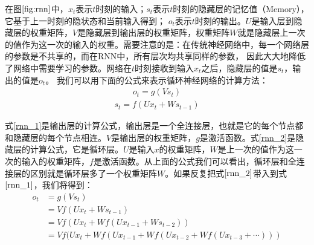 在图$\ref{fig:rnn}$中，$x_{t}$表示$t$时刻的输入；$s_{t}$表示$t$时刻的隐藏层的记忆值（Memory），它基于上一时刻的隐状态和当前输入得到；
$o_{t}$表示$t$时刻的输出。$U$是输入层到隐藏层的权重矩阵，$V$是隐藏层到输出层的权重矩阵，权重矩阵$W$就是隐藏层上一次的值作为这一次的输入的权重。需要注意的是：在传统神经网络中，每一个网络层的参数是不共享的，而在RNN中，所有层次均共享同样的参数，
因此大大地降低了网络中需要学习的参数。网络在$t$时刻接收到输入$x_{t}$之后，隐藏层的值是$s_{t}$，输出的值是$o_{t}$。
我们可以用下面的公式来表示循环神经网络的计算方法：
\begin{equation}
\label{rnn_1}
\begin{aligned}
o_{t}=g(V s_{t})
\end{aligned}
\end{equation}
\begin{equation}
\label{rnn_2}
\begin{aligned}
s_{t}=f(U x_{t}+W s_{t-1})
\end{aligned}
\end{equation}

式\eqref{rnn_1}是输出层的计算公式，输出层是一个全连接层，也就是它的每个节点都和隐藏层的每个节点相连。$V$是输出层的权重矩阵，$g$是激活函数。式\eqref{rnn_2}是隐藏层的计算公式，它是循环层。$U$是输入$x$的权重矩阵，$W$是上一次的值作为这一次的输入的权重矩阵，$f$是激活函数。从上面的公式我们可以看出，循环层和全连接层的区别就是循环层多了一个权重矩阵$W$。如果反复把式$\eqref{rnn_2}$带入到式$\eqref{rnn_1}$，我们将得到：
\begin{equation}
\label{rnn_3}
\begin{aligned}
o_{t}&=g(V s_{t})\\
&=V f(U x_{t}+W s_{t-1})\\
&=V f(U x_{t}+W f(U x_{t-1}+W s_{t-2}))\\
&=V f(U x_{t}+W f(U x_{t-1}+W f(U x_{t-2}+W f(U x_{t-3}+\cdots)))\\
\end{aligned}
\end{equation}

